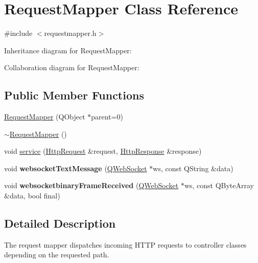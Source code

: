 \hypertarget{class_request_mapper}{}\section{Request\+Mapper Class Reference}
\label{class_request_mapper}


{\ttfamily \#include $<$requestmapper.\+h$>$}



Inheritance diagram for Request\+Mapper\+:


Collaboration diagram for Request\+Mapper\+:
\subsection*{Public Member Functions}
\begin{DoxyCompactItemize}
\item 
\mbox{\hyperlink{class_request_mapper_aeab4be2b6943c3e8856e4d3aab023b71}{Request\+Mapper}} (Q\+Object $\ast$parent=0)
\item 
\mbox{\hyperlink{class_request_mapper_af70f9ba02375a818287f4a91aad23ead}{$\sim$\+Request\+Mapper}} ()
\item 
void \mbox{\hyperlink{class_request_mapper_a5faa3e99e8599b260d2c9ec1479b6419}{service}} (\mbox{\hyperlink{classstefanfrings_1_1_http_request}{Http\+Request}} \&request, \mbox{\hyperlink{classstefanfrings_1_1_http_response}{Http\+Response}} \&response)
\item 
\mbox{\label{class_request_mapper_af3d6fb6cdaf3cc071fe021b013be22e0}} 
void {\bfseries websocket\+Text\+Message} (\mbox{\hyperlink{class_q_web_socket}{Q\+Web\+Socket}} $\ast$ws, const Q\+String \&data)
\item 
\mbox{\label{class_request_mapper_a84ef9d39bdd55f1fa8f50f213af59b62}} 
void {\bfseries websocketbinary\+Frame\+Received} (\mbox{\hyperlink{class_q_web_socket}{Q\+Web\+Socket}} $\ast$ws, const Q\+Byte\+Array \&data, bool final)
\end{DoxyCompactItemize}


\subsection{Detailed Description}
The request mapper dispatches incoming H\+T\+TP requests to controller classes depending on the requested path. 

